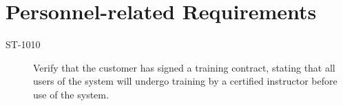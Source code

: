 \section{Personnel-related Requirements}

\begin{description}
\item[ST-1010] Verify that the customer has signed a training contract, stating that all users of the system will undergo training by a certified instructor before use of the system. 
\end{description}

